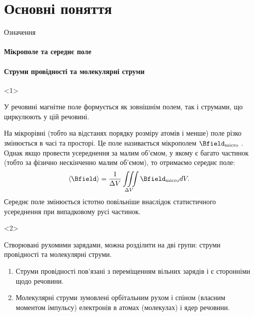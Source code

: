 \documentclass[onlytextwidth]{beamer}
\begin{document}
\section{Основні поняття}




\begin{frame}{Означення}{}
	\framesubtitle<1>{Мікрополе та середнє поле}
	\framesubtitle<2>{Струми провідності та молекулярні струми}
	\begin{onlyenv}
		\begin{block}{}\justifying
			У речовині магнітне поле формується як зовнішнім полем, так і струмами, що циркулюють у цій речовині.

			\bigskip

			На мікрорівні (тобто на відстанях
			порядку розміру атомів і менше) поле різко змінюється в часі та просторі. Це поле називається \alert{мікрополем} $\Bfield_\text{micro}$ .
			Однак якщо провести усереднення за малим об'ємом, у якому є багато частинок (тобто за фізично нескінченно малим об'ємом), то отримаємо
			середнє поле:
			\begin{equation*}
				\left\langle \Bfield\right\rangle = \frac1{\Delta V} \iiint\limits_{\Delta V}
				\Bfield_\text{micro} dV.
			\end{equation*}
			\alert{Середнє поле} змінюється істотно повільніше внаслідок статистичного усереднення при випадковому русі частинок.
		\end{block}
	\end{onlyenv}
	\begin{onlyenv}
		\begin{block}{}\justifying
			Створювані рухомими зарядами, можна розділити на дві групи: \alert{струми провідності} та \alert{молекулярні струми}.
			\begin{enumerate}
				\item \alert{Струми провідності} пов'язані з переміщенням вільних зарядів і є сторонніми щодо речовини.
				\item \alert{Молекулярні струми} зумовлені орбітальним рухом і спіном (власним моментом імпульсу) електронів в атомах (молекулах) і ядер речовини.
			\end{enumerate}
		\end{block}
	\end{onlyenv}
\end{frame}
\end{document}
